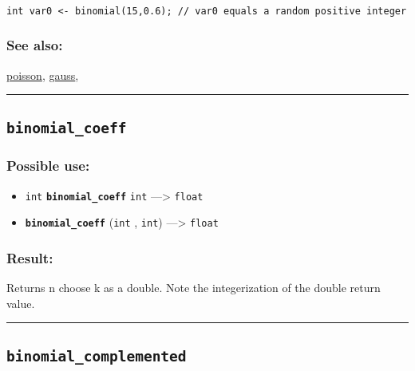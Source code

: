 \documentclass[]{book}
\providecommand{\tightlist}{%
  \setlength{\itemsep}{0pt}\setlength{\parskip}{0pt}}
\theoremstyle{definition}
\theoremstyle{definition}
\theoremstyle{definition}
\theoremstyle{remark}
\begin{document}
\begin{verbatim}
 
int var0 <- binomial(15,0.6); // var0 equals a random positive integer
\end{verbatim}

\subsubsection{See also:}\label{see-also-45}

\href{OperatorsNR\#poisson}{poisson}, \href{OperatorsDH\#gauss}{gauss},

\begin{center}\rule{0.5\linewidth}{\linethickness}\end{center}

\subsection{\texorpdfstring{\texttt{binomial\_coeff}}{binomial\_coeff}}\label{binomial_coeff}

\subsubsection{Possible use:}\label{possible-use-71}

\begin{itemize}
\tightlist
\item
  \texttt{int} \textbf{\texttt{binomial\_coeff}} \texttt{int}
  ---\textgreater{} \texttt{float}
\item
  \textbf{\texttt{binomial\_coeff}} (\texttt{int} , \texttt{int})
  ---\textgreater{} \texttt{float}
\end{itemize}

\subsubsection{Result:}\label{result-70}

Returns n choose k as a double. Note the integerization of the double
return value.

\begin{center}\rule{0.5\linewidth}{\linethickness}\end{center}

\subsection{\texorpdfstring{\texttt{binomial\_complemented}}{binomial\_complemented}}\label{binomial_complemented}
\end{document}
